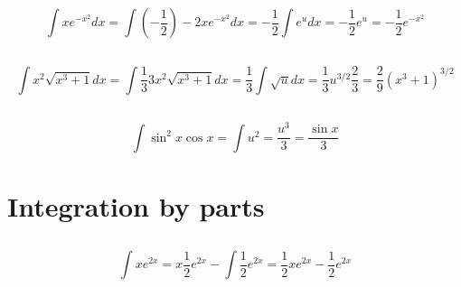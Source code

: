 \documentclass[11pt,oneside,titlepage]{book}
\begin{document}
\subsection{}

$$\int{x e^{-x^2}dx} =
\int{(- \frac 1 2) -2 x e^{-x^2}dx} =
- \frac 1 2 \int{  e^{u}dx} = - \frac 1 2 e^u = - \frac 1 2 e^{-x^2}
$$

\subsection{}

$$\int{x^2 \sqrt{x^3 + 1}dx} =
\int{\frac{1}{3} 3 x^2 \sqrt{x^3 + 1}dx} =
\frac{1}{3} \int{ \sqrt{u}dx} = \frac{1}{3} u^{3/2} \frac 2 3 = \frac 2 9 (x^3 + 1)^{3/2}
$$

\subsection{}

$$\int{\sin^2 x \cos x} =
\int {u^2} = \frac {u^3} 3= \frac {\sin x} 3
$$

\section{Integration by parts}

\subsection{}

$$ \int {x e^{2x}} =
 x \frac 1 2 e^{2x} - \int {\frac 1 2 e^{2x}} =  \frac 1 2  x e^{2x} - \frac 1 2 e^{2x} 
$$
\end{document}
